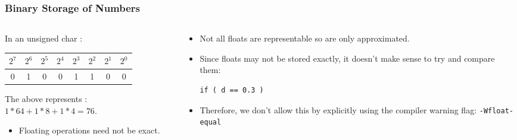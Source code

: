 
\begin{frame}[fragile]
\frametitle{Binary Storage of Numbers}

\begin{columns}

\begin{column}{0.45\textwidth}
In an unsigned char :
\begin{center}
\begin{tabular}{|c|c|c|c|c|c|c|c|}\hline
$2^7$ & $2^6$ & $2^5$ & $2^4$ & $2^3$ & $2^2$ & $2^1$ & $2^0$ \\ \hline
0     & 1     & 0     & 0     & 1     & 1     & 0     & 0     \\ \hline
\end{tabular}
\end{center}

The above represents : $1 * 64 + 1 * 8 + 1 * 4 = 76$.

\begin{itemize}[<+->]
\item Floating operations need not be exact.
\end{itemize}

\end{column}

\pause
\begin{column}{0.45\textwidth}
\begin{itemize}[<+->]
\item Not all floats are representable so are only approximated.
\item Since floats may not be stored exactly, it doesn't make sense to try and compare them:
\begin{lstlisting}[style=basicc,numbers=none]
if ( d == 0.3 )
\end{lstlisting}
\item Therefore, we don't allow this by explicitly using the compiler warning flag: {\tt -Wfloat-equal}
\end{itemize}
\end{column}

\end{columns}
\end{frame}


